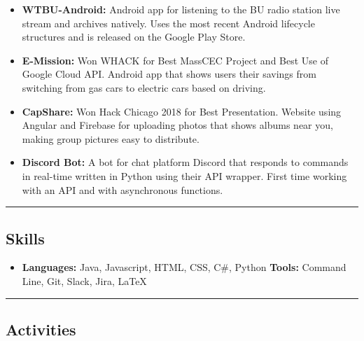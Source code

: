 \documentclass[11pt,letterpaper]{article}
\begin{document}
\begin{itemize}
	\parskip=0.1em
	
	\item \textbf{WTBU-Android:}
		Android app for listening to the BU radio station live stream and archives natively. Uses the most recent Android lifecycle structures and is released on the Google Play Store. 
	
	\item \textbf{E-Mission:}
		Won WHACK for Best MassCEC Project and Best Use of Google Cloud API. Android app that shows users their savings from switching from gas cars to electric cars based on driving. 
	
	\item \textbf{CapShare:}
		Won Hack Chicago 2018 for Best Presentation. Website using Angular and Firebase for uploading photos that shows albums near you, making group pictures easy to distribute. 
		
	\item \textbf{Discord Bot:}
		A bot for chat platform Discord that responds to commands in real-time written in Python using their API wrapper. First time working with an API and with asynchronous functions.

\end{itemize}

\hrule
\vspace{-0.4em}
\subsection*{Skills}

\begin{itemize}
	\parskip=0.1em

	\item \textbf{Languages:} Java, Javascript, HTML, CSS, C\#, Python \textbullet 
		\textbf{Tools:} Command Line, Git, Slack, Jira, \LaTeX
	
\end{itemize}

\hrule
\vspace{-0.4em}
\subsection*{Activities}
\end{document}

